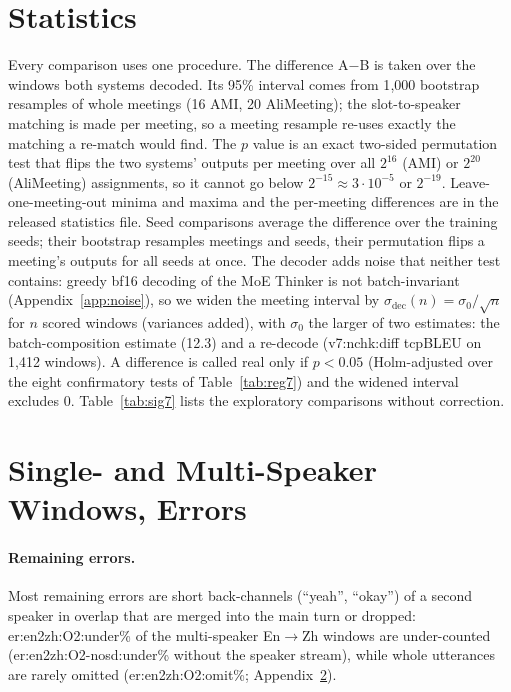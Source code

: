 



\section{Statistics}
\label{app:sig}
\label{app:stats7}




Every comparison uses one procedure. The difference A$-$B is taken over the windows both systems decoded. Its 95\%
interval comes from 1{,}000 bootstrap resamples of whole meetings (16 AMI, 20 AliMeeting); the slot-to-speaker matching
is made per meeting, so a meeting resample re-uses exactly the matching a re-match would find. The $p$ value is an
exact two-sided permutation test that flips the two systems' outputs per meeting over all $2^{16}$ (AMI) or $2^{20}$
(AliMeeting) assignments, so it cannot go below $2^{-15}\approx3\cdot10^{-5}$ or $2^{-19}$. Leave-one-meeting-out
minima and maxima and the per-meeting differences are in the released statistics file. Seed comparisons average the
difference over the training seeds; their bootstrap resamples meetings and seeds, their permutation flips a meeting's
outputs for all seeds at once. The decoder adds noise that neither test contains: greedy bf16 decoding of the MoE Thinker
is not batch-invariant (Appendix~\ref{app:noise}), so we widen the meeting interval by
$\sigma_\text{dec}(n)=\sigma_0/\sqrt{n}$ for $n$ scored windows (variances added), with $\sigma_0$ the larger of
two estimates: the batch-composition estimate (12.3) and a re-decode (\num{v7:nchk:diff} tcpBLEU on 1{,}412 windows). A difference is called real only if
$p<0.05$ (Holm-adjusted over the eight confirmatory tests of Table~\ref{tab:reg7}) and the widened interval excludes
0. Table~\ref{tab:sig7} lists the exploratory comparisons without correction.

\section{Single- and Multi-Speaker Windows, Errors}
\label{app:more}





\paragraph{Remaining errors.} Most remaining errors are short back-channels (``yeah'', ``okay'') of a second speaker in
overlap that are merged into the main turn or dropped: \num{er:en2zh:O2:under}\% of the multi-speaker En$\rightarrow$Zh
windows are under-counted (\num{er:en2zh:O2-nosd:under}\% without the speaker stream), while whole utterances are
rarely omitted (\num{er:en2zh:O2:omit}\%; Appendix~\ref{app:more}).

